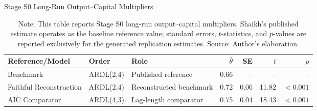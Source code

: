 \documentclass[11pt]{article}
\begin{document}
\begin{table}[H]
\centering
\caption{Stage S0 Long-Run Output--Capital Multipliers}
\label{tab:s0_model_lr_summary}
\footnotesize
\begin{tabular}{lllrrrr}
\toprule
Reference/Model & Order & Role & $\hat{\theta}$ & SE & $t$ & $p$ \\
\midrule
\midrule
\citet{Shaikh2016} Benchmark & ARDL(2,4) & Published reference & 0.66 & -- & -- & -- \\
Faithful Reconstruction & ARDL(2,4) & Reconstructed benchmark & 0.72 & 0.06 & 11.82 & $<0.001$ \\
AIC Comparator & ARDL(4,3) & Lag-length comparator & 0.75 & 0.04 & 18.43 & $<0.001$ \\
\bottomrule
\end{tabular}
\caption*{Note: This table reports Stage S0 long-run output--capital multipliers. Shaikh's published estimate operates as the baseline reference value; standard errors, $t$-statistics, and $p$-values are reported exclusively for the generated replication estimates. Source: Author's elaboration.}
\end{table}
\end{document}
